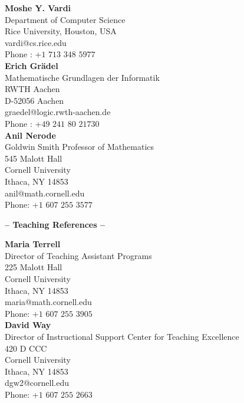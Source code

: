 \documentclass[a4paper]{article}
\def\tit#1{\medskip \begin{center}  {\Large {\bf -- #1 -- }} \end{center}}
\begin{document}
{\bf Moshe Y. Vardi}\\
Department of Computer Science\\
Rice University, Houston, USA\\
vardi@cs.rice.edu\\
Phone : +$1$ $713$ $348$ $5977$\\

{\bf Erich Gr\"adel}\\
Mathematische Grundlagen der Informatik\\
RWTH Aachen\\
D-52056 Aachen\\
graedel@logic.rwth-aachen.de\\
Phone :	+$49$ $241$ $80$ $21730$\\

{\bf Anil Nerode}\\
Goldwin Smith Professor of Mathematics\\
545 Malott Hall\\
Cornell University\\
	 Ithaca, NY 14853\\
	 anil@math.cornell.edu\\
Phone: +$1$  $607$ $255$ $3577$\\

\tit{Teaching References}

{\bf Maria Terrell}\\
 Director of Teaching Assistant Programs\\
 	 225 Malott Hall \\
	 Cornell University\\
	 Ithaca, NY 14853\\
	 maria@math.cornell.edu\\
Phone: +$1$  $607$ $255$ $3905$\\


{\bf David Way}\\
Director of Instructional Support
Center for Teaching Excellence\\
420 D CCC\\
Cornell University\\
Ithaca, NY 14853\\
dgw2@cornell.edu\\
Phone: +$1$ $607$ $255$ $2663$\\
\end{document}

